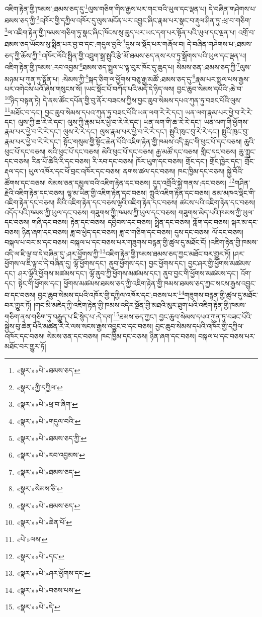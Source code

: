 འཇིག་རྟེན་གྱི་ཁམས་:ཐམས་ཅད་དུ་\footnote{«སྣར་»«པེ་»ཐམས་ཅད་}ལུས་གཅིག་གིས་རྒྱས་པར་གང་བའི་ཡུལ་དང་ལྡན་པ། དེ་བཞིན་གཤེགས་པ་ཐམས་ཅད་ཀྱི་\footnote{«སྣར་»ཀྱི་དཀྱིལ་}འཁོར་གྱི་དཀྱིལ་འཁོར་དུ་ལུས་མངོན་པར་འབྱུང་ཞིང་རྣམ་པར་སྣང་བ་རྡུལ་ཤིན་ཏུ་:ཕྲ་བ་གཅིག་\footnote{«སྣར་»«པེ་»ཕྲ་བ་ཞིག་}ལ་འཇིག་རྟེན་གྱི་ཁམས་གཅིག་ཏུ་སྣང་ཞིང་ཁོངས་སུ་ཆུད་པར་ཡང་དག་པར་སྟོན་པའི་ཡུལ་དང་ལྡན་པ། འགྲོ་བ་ཐམས་ཅད་ཡོངས་སུ་སྨིན་པར་བྱ་བ་དང་:གདུལ་བྱའི་\footnote{«སྣར་»«པེ་»གདུལ་བའི་}དུས་ལ་སྡོད་པར་གཞོལ་བ། དེ་བཞིན་གཤེགས་པ་:ཐམས་ཅད་ཀྱི་ཆོས་ཀྱི་\footnote{«སྣར་»«པེ་»ཐམས་ཅད་ཀྱི་}འཁོར་ལོའི་སྤྲིན་གྱི་འབྲུག་སྒྲ་སྤུའི་རྩེ་མོ་ཐམས་ཅད་ནས་རབ་ཏུ་སྒྲོགས་པའི་ཡུལ་དང་ལྡན་པ། འཇིག་རྟེན་གྱི་ཁམས་:རབ་འབྱམ་\footnote{«སྣར་»«པེ་»རབ་འབྱམས་}ཐམས་ཅད་སྤྲུལ་པ་ལྟ་བུར་ཁོང་དུ་ཆུད་པ། སེམས་ཅན་:ཐམས་ཅད་ཀྱི་\footnote{«སྣར་»«པེ་»ཐམས་ཅད་}ལུས་མཉམ་པ་ཀུན་ཏུ་སྟོན་པ། :སེམས་ཀྱི་\footnote{«སྣར་»སེམས་ཅི་}སྐད་ཅིག་ལ་ཕྱོགས་བཅུ་རྒྱ་མཚོ་:ཐམས་ཅད་དུ་\footnote{«སྣར་»«པེ་»ཐམས་ཅད་}རྣམ་པར་སྤྲུལ་པས་རྒྱས་པར་འགེངས་པའོ་ཞེས་གསུངས་སོ། །ཡང་སྡོང་པོ་བཀོད་པའི་མདོ་དེ་ཉིད་ལས། བྱང་ཆུབ་སེམས་དཔའི་:ཆེ་བ་\footnote{«སྣར་»«པེ་»ཆེན་པོ་}ཉིད་བསྟན་ཏེ། དེ་ནས་ཚོང་དཔོན་གྱི་བུ་ནོར་བཟངས་ཀྱིས་བྱང་ཆུབ་སེམས་དཔའ་ཀུན་ཏུ་བཟང་པོའི་ལུས་\footnote{«པེ་»ལས་}མཐོང་བ་དང་། བྱང་ཆུབ་སེམས་དཔའ་ཀུན་ཏུ་བཟང་པོའི་ཡན་ལག་རེ་རེ་དང་། ཡན་ལག་རྣམ་པར་ཕྱེ་བ་རེ་རེ་དང་། ལུས་ཀྱི་ཆ་རེ་རེ་དང་། ལུས་ཀྱི་རྣམ་པར་ཕྱེ་བ་རེ་རེ་དང་། ཡན་ལག་གི་ཆ་རེ་རེ་དང་། ཡན་ལག་གི་ཕྱོགས་རྣམ་པར་ཕྱེ་བ་རེ་རེ་དང་། ལུས་རེ་རེ་དང་། ལུས་རྣམ་པར་ཕྱེ་བ་རེ་རེ་དང་། སྤུའི་ཁུང་བུ་རེ་རེ་དང་། སྤུའི་ཁུང་བུ་རྣམ་པར་ཕྱེ་བ་རེ་རེ་དང་། སྟོང་གསུམ་གྱི་སྟོང་ཆེན་པོའི་འཇིག་རྟེན་གྱི་ཁམས་འདི་རླང་གི་ཕུང་པོ་དང་བཅས། ཆུའི་ཕུང་པོ་དང་བཅས། སའི་ཕུང་པོ་དང་བཅས། མེའི་ཕུང་པོ་དང་བཅས། རྒྱ་མཚོ་དང་བཅས། གླིང་དང་བཅས། ཆུ་ཀླུང་དང་བཅས། རིན་པོ་ཆེའི་རི་དང་བཅས། རི་རབ་དང་བཅས། ཁོར་ཡུག་དང་བཅས། གྲོང་དང་། གྲོང་ཁྱེར་དང་། གྲོང་རྡལ་དང་། ཡུལ་འཁོར་དང་ཕོ་བྲང་འཁོར་དང་བཅས། ནགས་ཚལ་དང་བཅས། ཁང་ཁྱིམ་དང་བཅས། སྐྱེ་བོའི་ཚོགས་དང་བཅས། སེམས་ཅན་དམྱལ་བའི་འཇིག་རྟེན་དང་བཅས། དུད་འགྲོའི་སྐྱེ་གནས་:དང་བཅས། \footnote{«སྣར་»«པེ་»དང་}གཤིན་རྗེའི་འཇིག་རྟེན་དང་བཅས། ལྷ་མ་ཡིན་གྱི་འཇིག་རྟེན་དང་བཅས། ཀླུའི་འཇིག་རྟེན་དང་བཅས། ནམ་མཁའ་ལྡིང་གི་འཇིག་རྟེན་དང་བཅས། མིའི་འཇིག་རྟེན་དང་བཅས་ལྷའི་འཇིག་རྟེན་དང་བཅས། ཚངས་པའི་འཇིག་རྟེན་དང་བཅས། འདོད་པའི་ཁམས་ཀྱི་ཡུལ་དང་བཅས། གཟུགས་ཀྱི་ཁམས་ཀྱི་ཡུལ་དང་བཅས། གཟུགས་མེད་པའི་ཁམས་ཀྱི་ཡུལ་དང་བཅས། གཞི་དང་བཅས། རྟེན་དང་བཅས། དབྱིབས་དང་བཅས། སྤྲིན་དང་བཅས། གློག་དང་བཅས། སྐར་མ་དང་བཅས། ཉིན་ཞག་དང་བཅས། ཟླ་བ་ཕྱེད་དང་བཅས། ཟླ་བ་གཅིག་དང་བཅས། དུས་དང་བཅས། ལོ་དང་བཅས། བསྐལ་པ་བར་མ་དང་བཅས། བསྐལ་པ་དང་བཅས་པར་གཟུགས་བརྙན་གྱི་ཚུལ་དུ་མཐོང་ངོ། །འཇིག་རྟེན་གྱི་ཁམས་འདི་ལ་ཇི་ལྟ་བ་དེ་བཞིན་དུ་:ཤར་ཕྱོགས་ཀྱི་\footnote{«སྣར་»«པེ་»ཤར་ཕྱོགས་དང་}འཇིག་རྟེན་གྱི་ཁམས་ཐམས་ཅད་ཀྱང་མཐོང་བར་གྱུར་ཏོ། །ཤར་ཕྱོགས་ལ་ཇི་ལྟ་བ་དེ་བཞིན་དུ། ལྷོ་ཕྱོགས་དང་། ནུབ་ཕྱོགས་དང་། བྱང་ཕྱོགས་དང་། བྱང་ཤར་གྱི་ཕྱོགས་མཚམས་དང་། ཤར་ལྷོའི་ཕྱོགས་མཚམས་དང་། ལྷོ་ནུབ་ཀྱི་ཕྱོགས་མཚམས་དང་། ནུབ་བྱང་གི་ཕྱོགས་མཚམས་དང་། འོག་དང་། སྟེང་གི་ཕྱོགས་དང་། ཕྱོགས་མཚམས་ཐམས་ཅད་ཀྱི་འཇིག་རྟེན་གྱི་ཁམས་ཐམས་ཅད་ཀྱང་སངས་རྒྱས་འབྱུང་བ་དང་བཅས། བྱང་ཆུབ་སེམས་དཔའི་འཁོར་གྱི་དཀྱིལ་འཁོར་དང་:བཅས་པར་\footnote{«སྣར་»«པེ་»བཅས་པས་}གཟུགས་བརྙན་གྱི་ཚུལ་དུ་མཐོང་བར་གྱུར་ཏོ། །གང་མི་མཇེད་ཀྱི་འཇིག་རྟེན་གྱི་ཁམས་འདིར་སྔོན་གྱི་མཐའི་མུར་ཐུག་པའི་འཇིག་རྟེན་གྱི་ཁམས་གཅིག་ནས་གཅིག་ཏུ་བརྒྱུད་པ་ཇི་སྙེད་པ་:དེ་དག་\footnote{«སྣར་»«པེ་»དེ་}ཐམས་ཅད་ཀྱང་། བྱང་ཆུབ་སེམས་དཔའ་ཀུན་ཏུ་བཟང་པོའི་སྐྱེས་བུ་ཆེན་པོའི་མཚན་རེ་རེ་ལས་སངས་རྒྱས་འབྱུང་བ་དང་བཅས། བྱང་ཆུབ་སེམས་དཔའི་འཁོར་གྱི་དཀྱིལ་འཁོར་དང་བཅས། སེམས་ཅན་དང་བཅས། ཁང་ཁྱིམ་དང་བཅས། ཉིན་ཞག་དང་བཅས། བསྐལ་པ་དང་བཅས་པར་མཐོང་བར་གྱུར་ཏོ། 